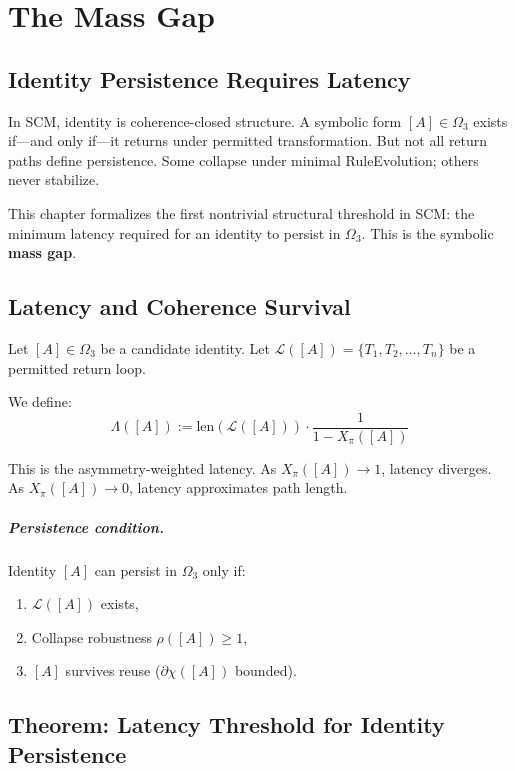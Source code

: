 \chapter{The Mass Gap}

\section{Identity Persistence Requires Latency}

In SCM, identity is coherence-closed structure. A symbolic form $[A] \in \Omega_3$ exists if—and only if—it returns under permitted transformation. But not all return paths define persistence. Some collapse under minimal RuleEvolution; others never stabilize. 

This chapter formalizes the first nontrivial structural threshold in SCM: the minimum latency required for an identity to persist in $\Omega_3$. This is the symbolic \textbf{mass gap}.

\section{Latency and Coherence Survival}

Let $[A] \in \Omega_3$ be a candidate identity. Let $\mathcal{L}([A]) = \{T_1, T_2, \dots, T_n\}$ be a permitted return loop.

We define:
\begin{equation} \label{eq:euler-latency}
\Lambda([A]) := \text{len}(\mathcal{L}([A])) \cdot \frac{1}{1 - X_\pi([A])}
\end{equation}

This is the asymmetry-weighted latency. As $X_\pi([A]) \to 1$, latency diverges. As $X_\pi([A]) \to 0$, latency approximates path length.

\paragraph{Persistence condition.} Identity $[A]$ can persist in $\Omega_3$ only if:
\begin{enumerate}
  \item $\mathcal{L}([A])$ exists,
  \item Collapse robustness $\rho([A]) \geq 1$,
  \item $[A]$ survives reuse ($\partial\chi([A])$ bounded).
\end{enumerate}

\section{Theorem: Latency Threshold for Identity Persistence}


